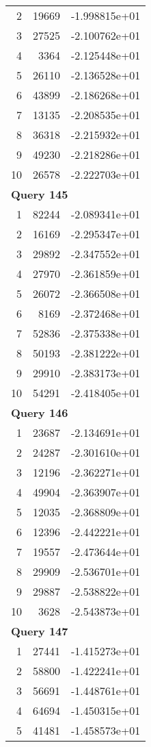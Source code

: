 \begin{longtable}[{p}]{@{}rrp{}@{}}
2 & 19669 & -1.998815e+01 \\
3 & 27525 & -2.100762e+01 \\
4 & 3364 & -2.125448e+01 \\
5 & 26110 & -2.136528e+01 \\
6 & 43899 & -2.186268e+01 \\
7 & 13135 & -2.208535e+01 \\
8 & 36318 & -2.215932e+01 \\
9 & 49230 & -2.218286e+01 \\
10 & 26578 & -2.222703e+01 \\
\midrule
\multicolumn{3}{l}{\bfseries Query 145} \\
1 & 82244 & -2.089341e+01 \\
2 & 16169 & -2.295347e+01 \\
3 & 29892 & -2.347552e+01 \\
4 & 27970 & -2.361859e+01 \\
5 & 26072 & -2.366508e+01 \\
6 & 8169 & -2.372468e+01 \\
7 & 52836 & -2.375338e+01 \\
8 & 50193 & -2.381222e+01 \\
9 & 29910 & -2.383173e+01 \\
10 & 54291 & -2.418405e+01 \\
\midrule
\multicolumn{3}{l}{\bfseries Query 146} \\
1 & 23687 & -2.134691e+01 \\
2 & 24287 & -2.301610e+01 \\
3 & 12196 & -2.362271e+01 \\
4 & 49904 & -2.363907e+01 \\
5 & 12035 & -2.368809e+01 \\
6 & 12396 & -2.442221e+01 \\
7 & 19557 & -2.473644e+01 \\
8 & 29909 & -2.536701e+01 \\
9 & 29887 & -2.538822e+01 \\
10 & 3628 & -2.543873e+01 \\
\midrule
\multicolumn{3}{l}{\bfseries Query 147} \\
1 & 27441 & -1.415273e+01 \\
2 & 58800 & -1.422241e+01 \\
3 & 56691 & -1.448761e+01 \\
4 & 64694 & -1.450315e+01 \\
5 & 41481 & -1.458573e+01 \\

\end{longtable}
